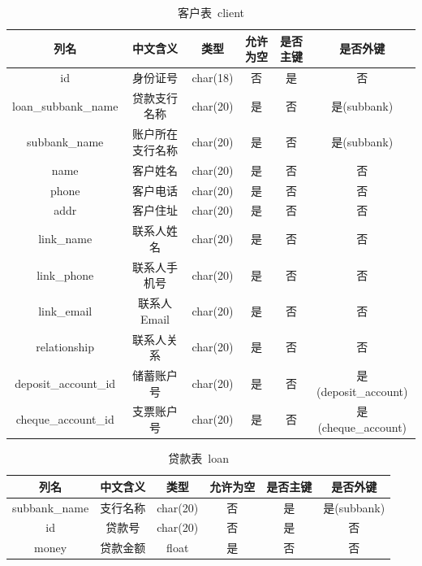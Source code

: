\documentclass{article}
\begin{document}
    \begin{table}[H]
        \centering
        \caption{客户表\ client}
        \begin{tabular}{cccccc}
            \hline
            列名 & 中文含义 & 类型 & 允许为空 & 是否主键 & 是否外键 \\
            \hline
            id & 身份证号 & char(18) & 否 & 是 & 否 \\
            loan\_subbank\_name & 贷款支行名称 & char(20) & 是 & 否 & 是(subbank) \\
            subbank\_name & 账户所在支行名称 & char(20) & 是 & 否 & 是(subbank) \\
            name & 客户姓名 & char(20) & 是 & 否 & 否 \\
            phone & 客户电话 & char(20) & 是 & 否 & 否 \\
            addr & 客户住址 & char(20) & 是 & 否 & 否 \\
            link\_name & 联系人姓名 & char(20) & 是 & 否 & 否 \\
            link\_phone & 联系人手机号 & char(20) & 是 & 否 & 否 \\
            link\_email & 联系人Email & char(20) & 是 & 否 & 否 \\
            relationship & 联系人关系 & char(20) & 是 & 否 & 否 \\
            deposit\_account\_id & 储蓄账户号 & char(20) & 是 & 否 & 是(deposit\_account) \\
            cheque\_account\_id & 支票账户号 & char(20) & 是 & 否 & 是(cheque\_account) \\
            \hline
        \end{tabular}
    \end{table}
    \begin{table}[H]
        \centering
        \caption{贷款表\ loan}
        \begin{tabular}{cccccc}
            \hline
            列名 & 中文含义 & 类型 & 允许为空 & 是否主键 & 是否外键 \\
            \hline
            subbank\_name & 支行名称 & char(20) & 否 & 是 & 是(subbank) \\
            id & 贷款号 & char(20) & 否 & 是 & 否 \\
            money & 贷款金额 & float & 是 & 否 & 否 \\
            \hline
        \end{tabular}
    \end{table}
\end{document}
